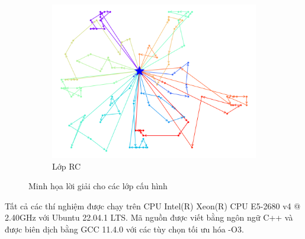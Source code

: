 \begin{figure}[H]
\begin{subfigure}{.3\textwidth}
		\includegraphics[width=1\linewidth]{figures/routes_rc101.png}
		\caption{Lớp RC}
		\label{fig:route_rc}
	\end{subfigure}
	\caption{Minh họa lời giải cho các lớp cấu hình}
\end{figure}

Tất cả các thí nghiệm được chạy trên CPU Intel(R) Xeon(R) CPU E5-2680 v4 @ 2.40GHz với Ubuntu 22.04.1 LTS. Mã nguồn được viết bằng ngôn ngữ C++ và được biên dịch bằng GCC 11.4.0 với các tùy chọn tối ưu hóa -O3.




